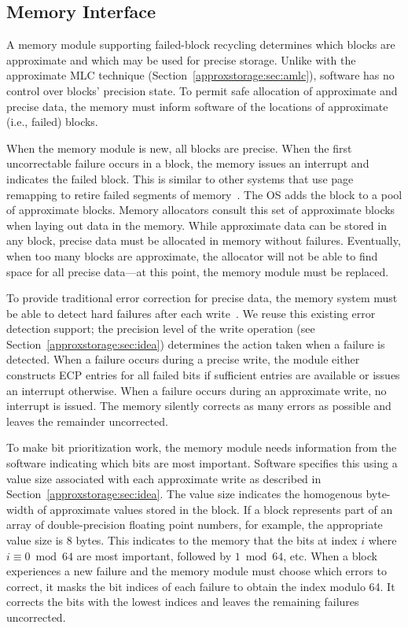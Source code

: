 \subsection{Memory Interface}
\label{approxstorage:sec:recycling-interface}

A memory module supporting failed-block recycling determines which blocks are
approximate and which may be used for precise storage. Unlike with the
approximate MLC technique (Section~\ref{approxstorage:sec:amlc}), software has no control
over blocks' precision state. To permit safe allocation of approximate and
precise data, the memory must inform software of the locations of approximate
(i.e., failed) blocks.

When the memory module is new, all blocks are precise. When the first
uncorrectable failure occurs in a block, the memory issues an interrupt
and indicates the failed block.
This is similar to other systems that use page remapping to retire failed
segments of memory~\cite{durable-pcm-mm,drm}.
The OS adds the
block to a pool of approximate blocks. Memory allocators consult this set of
approximate blocks when laying out data in the memory. While approximate data
can be stored in any block, precise data must be allocated in memory without
failures. Eventually, when too many blocks are approximate, the allocator will
not be able to find space for all precise data---at this point, the memory
module must be replaced.

To provide traditional error correction for precise data, the memory system must be
able to detect hard failures after each write~\cite{ecp}. We reuse this
existing error detection support; the precision level of
the write operation (see Section~\ref{approxstorage:sec:idea}) determines the action taken
when a failure is detected. When a failure occurs during a precise write, the
module either constructs ECP entries for all failed bits if sufficient
entries are available or issues an interrupt otherwise. When a failure occurs
during an approximate write, no interrupt is issued. The memory silently
corrects as many errors as possible and leaves the remainder uncorrected.

To make bit prioritization work, the memory module needs information from
the software indicating which bits are most important. Software specifies this
using a value size associated with each approximate write as described in
Section~\ref{approxstorage:sec:idea}. The value size indicates the homogenous byte-width of
approximate values stored in the block. If a block represents part of an array
of double-precision floating point numbers, for example, the appropriate value
size is 8 bytes. This indicates to the memory that the bits at index $i$ where
$i \equiv 0 \bmod{64}$ are most important, followed by $1 \bmod{64}$, etc. When
a block experiences a new failure and the memory module must
choose which errors to correct, it masks the bit indices of
each failure to obtain the index modulo 64. It corrects the bits with the
lowest indices and leaves the remaining failures uncorrected.

